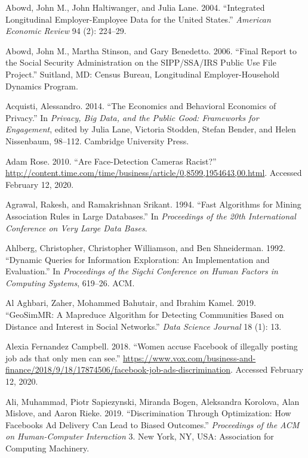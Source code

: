 \documentclass[]{krantz}
\begin{document}
\hypertarget{ref-abowd2004integrated}{}
Abowd, John M., John Haltiwanger, and Julia Lane. 2004. ``Integrated
Longitudinal Employer-Employee Data for the United States.''
\emph{American Economic Review} 94 (2): 224--29.

\hypertarget{ref-abowd2006final}{}
Abowd, John M., Martha Stinson, and Gary Benedetto. 2006. ``Final Report
to the Social Security Administration on the SIPP/SSA/IRS Public Use
File Project.'' Suitland, MD: Census Bureau, Longitudinal
Employer-Household Dynamics Program.

\hypertarget{ref-Acquisti2014}{}
Acquisti, Alessandro. 2014. ``The Economics and Behavioral Economics of
Privacy.'' In \emph{Privacy, Big Data, and the Public Good: Frameworks
for Engagement}, edited by Julia Lane, Victoria Stodden, Stefan Bender,
and Helen Nissenbaum, 98--112. Cambridge University Press.

\hypertarget{ref-rose2010}{}
Adam Rose. 2010. ``Are Face-Detection Cameras Racist?''
\url{http://content.time.com/time/business/article/0,8599,1954643,00.html}.
Accessed February 12, 2020.

\hypertarget{ref-Agrawal1994}{}
Agrawal, Rakesh, and Ramakrishnan Srikant. 1994. ``Fast Algorithms for
Mining Association Rules in Large Databases.'' In \emph{Proceedings of
the 20th International Conference on Very Large Data Bases}.

\hypertarget{ref-ahlberg1992dynamic}{}
Ahlberg, Christopher, Christopher Williamson, and Ben Shneiderman. 1992.
``Dynamic Queries for Information Exploration: An Implementation and
Evaluation.'' In \emph{Proceedings of the Sigchi Conference on Human
Factors in Computing Systems}, 619--26. ACM.

\hypertarget{ref-aghbari2019}{}
Al Aghbari, Zaher, Mohammed Bahutair, and Ibrahim Kamel. 2019.
``GeoSimMR: A Mapreduce Algorithm for Detecting Communities Based on
Distance and Interest in Social Networks.'' \emph{Data Science Journal}
18 (1): 13.

\hypertarget{ref-campbell2018}{}
Alexia Fernandez Campbell. 2018. ``Women accuse Facebook of illegally
posting job ads that only men can see.''
\url{https://www.vox.com/business-and-finance/2018/9/18/17874506/facebook-job-ads-discrimination}.
Accessed February 12, 2020.

\hypertarget{ref-ali2019}{}
Ali, Muhammad, Piotr Sapiezynski, Miranda Bogen, Aleksandra Korolova,
Alan Mislove, and Aaron Rieke. 2019. ``Discrimination Through
Optimization: How Facebooks Ad Delivery Can Lead to Biased Outcomes.''
\emph{Proceedings of the ACM on Human-Computer Interaction} 3. New York,
NY, USA: Association for Computing Machinery.
\end{document}
